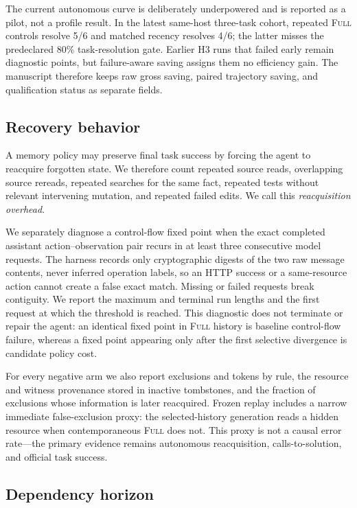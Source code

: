 \documentclass[11pt]{article}
\begin{document}
The current autonomous curve is deliberately underpowered and is reported as
a pilot, not a profile result. In the latest same-host three-task cohort,
repeated \textsc{Full} controls resolve 5/6 and matched recency resolves 4/6;
the latter misses the predeclared 80\% task-resolution gate. Earlier H3 runs
that failed early remain diagnostic points, but failure-aware saving assigns
them no efficiency gain. The manuscript therefore keeps raw gross saving,
paired trajectory saving, and qualification status as separate fields.

\subsection{Recovery behavior}

A memory policy may preserve final task success by forcing the agent to
reacquire forgotten state. We therefore count repeated source reads,
overlapping source rereads, repeated searches for the same fact, repeated tests
without relevant intervening mutation, and repeated failed edits. We call this
\emph{reacquisition overhead}.

We separately diagnose a control-flow fixed point when the exact completed
assistant action--observation pair recurs in at least three consecutive model
requests.  The harness records only cryptographic digests of the two raw
message contents, never inferred operation labels, so an HTTP success or a
same-resource action cannot create a false exact match.  Missing or failed
requests break contiguity.  We report the maximum and terminal run lengths and
the first request at which the threshold is reached.  This diagnostic does not
terminate or repair the agent: an identical fixed point in \textsc{Full}
history is baseline control-flow failure, whereas a fixed point appearing only
after the first selective divergence is candidate policy cost.

For every negative arm we also report exclusions and tokens by rule, the
resource and witness provenance stored in inactive tombstones, and the fraction
of exclusions whose information is later reacquired. Frozen replay includes a
narrow immediate false-exclusion proxy: the selected-history generation reads
a hidden resource when contemporaneous \textsc{Full} does not. This proxy is
not a causal error rate---the primary evidence remains autonomous
reacquisition, calls-to-solution, and official task success.

\subsection{Dependency horizon}
\end{document}
